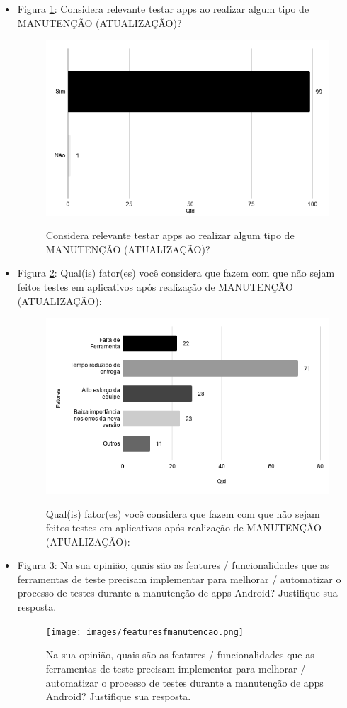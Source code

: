 \begin{itemize}
    
    \item Figura \ref{figure:s_imptestarmanutencao}: Considera relevante testar apps ao realizar algum tipo de MANUTENÇÃO (ATUALIZAÇÃO)?
    \begin{figure}[!htb]
    \centering
    \includegraphics[width=.55\textwidth]{images/s_imptestarmanutencao.png}
    \label{figure:s_imptestarmanutencao}
    \caption{Considera relevante testar apps ao realizar algum tipo de MANUTENÇÃO (ATUALIZAÇÃO)?}
    \end{figure}
    
    
    \item Figura \ref{figure:s_fatorestestemanutencao}: Qual(is) fator(es) você considera que fazem com que não sejam feitos testes em aplicativos após realização de MANUTENÇÃO (ATUALIZAÇÃO):
    \begin{figure}[!htb]
    \centering
    \includegraphics[width=.55\textwidth]{images/s_fatorestestemanutencao.png}
    \label{figure:s_fatorestestemanutencao}
    \caption{Qual(is) fator(es) você considera que fazem com que não sejam feitos testes em aplicativos após realização de MANUTENÇÃO (ATUALIZAÇÃO):}
    \end{figure}
    

    \item Figura \ref{figure:s_featuresfmanutencao}: Na sua opinião, quais são as features / funcionalidades que as ferramentas de teste precisam implementar para melhorar / automatizar o processo de testes  durante a manutenção de apps Android? Justifique sua resposta.
    \begin{figure}[!htb]
    \centering
    \texttt{[image: images/featuresfmanutencao.png]}
    \label{figure:s_featuresfmanutencao}
    \caption{Na sua opinião, quais são as features / funcionalidades que as ferramentas de teste precisam implementar para melhorar / automatizar o processo de testes  durante a manutenção de apps Android? Justifique sua resposta.}
    \end{figure}   
    

\end{itemize}
